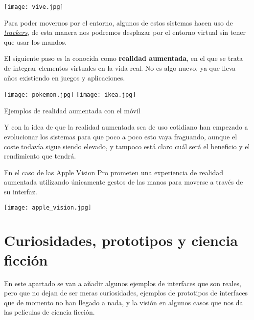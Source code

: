 \vspace{-10pt}
\begin{center}
    \texttt{[image: vive.jpg]}
\end{center}

Para poder movernos por el entorno, algunos de estos sistemas hacen uso de \textit{\href{https://www.vive.com/us/accessory/tracker3/}{trackers}}, de esta manera nos podremos desplazar por el entorno virtual sin tener que usar los mandos.

El siguiente paso es la conocida como \textbf{realidad aumentada}, en el que se trata de integrar elementos virtuales en la vida real. No es algo nuevo, ya que lleva años existiendo en juegos y aplicaciones.

\vspace{-10pt}
{
    \hfill
    \texttt{[image: pokemon.jpg]}
    \hfill
    \texttt{[image: ikea.jpg]}
    \hfill
}

\vspace{-15pt}
\begin{center}
    {\scriptsize  Ejemplos de realidad aumentada con el móvil}
\end{center}

Y con la idea de que la realidad aumentada sea de uso cotidiano han empezado a evolucionar los sistemas para que poco a poco esto vaya fraguando, aunque el coste todavía sigue siendo elevado, y tampoco está claro cuál será el beneficio y el rendimiento que tendrá.

En el caso de las Apple Vision Pro prometen una experiencia de realidad aumentada utilizando únicamente gestos de las manos para moverse a través de su interfaz.

\vspace{-10pt}
\begin{center}
    \texttt{[image: apple\_vision.jpg]}
\end{center}



\chapter{Curiosidades, prototipos y ciencia ficción}

En este apartado se van a añadir algunos ejemplos de interfaces que son reales, pero que no dejan de ser meras curiosidades, ejemplos de prototipos de interfaces que de momento no han llegado a nada, y la visión en algunos casos que nos da las películas de ciencia ficción.


